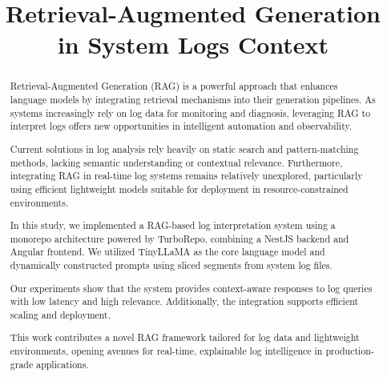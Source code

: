 \documentclass[conference]{IEEEtran}
\begin{document}
\title{Retrieval-Augmented Generation in System Logs Context \\
}

\author{
\and
{}
}

\maketitle

\begin{abstract}
Retrieval-Augmented Generation (RAG) is a powerful approach that enhances language models by integrating retrieval mechanisms into their generation pipelines. As systems increasingly rely on log data for monitoring and diagnosis, leveraging RAG to interpret logs offers new opportunities in intelligent automation and observability.

Current solutions in log analysis rely heavily on static search and pattern-matching methods, lacking semantic understanding or contextual relevance. Furthermore, integrating RAG in real-time log systems remains relatively unexplored, particularly using efficient lightweight models suitable for deployment in resource-constrained environments.

In this study, we implemented a RAG-based log interpretation system using a monorepo architecture powered by TurboRepo, combining a NestJS backend and Angular frontend. We utilized TinyLLaMA as the core language model and dynamically constructed prompts using sliced segments from system log files.

Our experiments show that the system provides context-aware responses to log queries with low latency and high relevance. Additionally, the integration supports efficient scaling and deployment.

This work contributes a novel RAG framework tailored for log data and lightweight environments, opening avenues for real-time, explainable log intelligence in production-grade applications.
\end{abstract}
\end{document}
